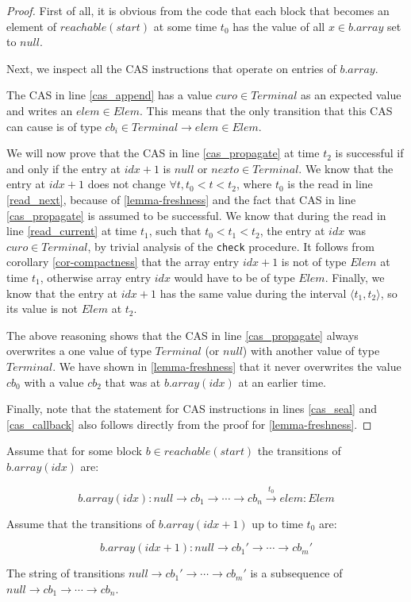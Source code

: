 \documentclass[runningheads,a4paper]{llncs}
\begin{document}
\begin{proof}
First of all, it is obvious from the code that each block that becomes
an element of $reachable(start)$ at some time $t_0$ has the value of
all $x \in b.array$ set to $null$.

Next, we inspect all the CAS instructions that operate on entries of
$b.array$.

The CAS in line \ref{cas_append} has a value $curo \in Terminal$ as
an expected value and writes an $elem \in Elem$.
This means that the only transition that this CAS
can cause is of type $cb_i \in Terminal \rightarrow elem \in Elem$.

We will now prove that the CAS in line \ref{cas_propagate} at time $t_2$ is successful if and
only if the entry at $idx + 1$ is $null$ or $nexto \in
Terminal$.
We know that the entry at $idx + 1$ does not change $\forall t, t_0 < t < t_2$,
where $t_0$ is the read in line \ref{read_next},
because of \ref{lemma-freshness} and the fact that CAS in line \ref{cas_propagate} is assumed to be successful.
We know that during the read in line \ref{read_current} at time $t_1$,
such that $t_0 < t_1 < t_2$, the entry at $idx$ was $curo \in
Terminal$, by trivial analysis of the \verb=check= procedure.
It follows from corollary \ref{cor-compactness} that the array entry $idx
+ 1$ is not of type $Elem$ at time $t_1$, otherwise array entry $idx$
would have to be of type $Elem$.
Finally, we know that the entry at $idx + 1$ has the same value during
the interval $\langle t_1, t_2 \rangle$, so its value is not $Elem$ at $t_2$.

The above reasoning shows that the CAS in line \ref{cas_propagate}
always overwrites a one value of type $Terminal$ (or $null$) with
another value of type $Terminal$.
We have shown in \ref{lemma-freshness} that it never
overwrites the value $cb_0$ with a value $cb_2$ that was at
$b.array(idx)$ at an earlier time.

Finally, note that the statement for CAS instructions in lines \ref{cas_seal} and
\ref{cas_callback} also follows directly from the proof for \ref{lemma-freshness}.
\end{proof}


\begin{lemma}[Subsequence]\label{lemma-subsequence}
Assume that for some block $b \in reachable(start)$ the transitions of
$b.array(idx)$ are:

\begin{equation*}
b.array(idx): null \rightarrow cb_1 \rightarrow \cdots \rightarrow
cb_n \stackrel{t_0}{\rightarrow} elem: Elem
\end{equation*}

Assume that the transitions of $b.array(idx + 1)$ up to time $t_0$ are:

\begin{equation*}
b.array(idx + 1): null \rightarrow cb_1' \rightarrow \cdots
\rightarrow cb_m'
\end{equation*}

The string of transitions $null \rightarrow cb_1' \rightarrow \cdots
\rightarrow cb_m'$ is a subsequence of $null \rightarrow cb_1
\rightarrow \cdots \rightarrow cb_n$.
\end{lemma}
\end{document}
